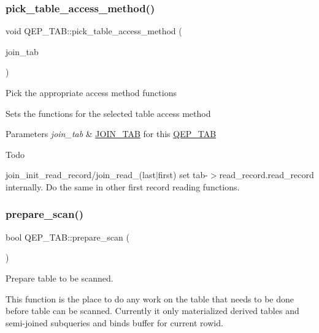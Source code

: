 \subsubsection{\texorpdfstring{pick\+\_\+table\+\_\+access\+\_\+method()}{pick\_table\_access\_method()}}
{\footnotesize\ttfamily void Q\+E\+P\+\_\+\+T\+A\+B\+::pick\+\_\+table\+\_\+access\+\_\+method (\begin{DoxyParamCaption}\item[{const \mbox{\hyperlink{classJOIN__TAB}{J\+O\+I\+N\+\_\+\+T\+AB}} $\ast$}]{join\+\_\+tab }\end{DoxyParamCaption})}

Pick the appropriate access method functions

Sets the functions for the selected table access method


\begin{DoxyParams}{Parameters}
{\em join\+\_\+tab} & \mbox{\hyperlink{classJOIN__TAB}{J\+O\+I\+N\+\_\+\+T\+AB}} for this \mbox{\hyperlink{classQEP__TAB}{Q\+E\+P\+\_\+\+T\+AB}}\\
\hline
\end{DoxyParams}
\begin{DoxyRefDesc}{Todo}
\item[\mbox{\hyperlink{todo__todo000081}{Todo}}]join\+\_\+init\+\_\+read\+\_\+record/join\+\_\+read\+\_\+(last$\vert$first) set tab-\/$>$read\+\_\+record.\+read\+\_\+record internally. Do the same in other first record reading functions. \end{DoxyRefDesc}
\mbox{\label{group__Query__Executor_ga0f7e9ff5a681a6bcc59e6e1f9af62b76}} 
\subsubsection{\texorpdfstring{prepare\+\_\+scan()}{prepare\_scan()}}
{\footnotesize\ttfamily bool Q\+E\+P\+\_\+\+T\+A\+B\+::prepare\+\_\+scan (\begin{DoxyParamCaption}{ }\end{DoxyParamCaption})}



Prepare table to be scanned. 

This function is the place to do any work on the table that needs to be done before table can be scanned. Currently it only materialized derived tables and semi-\/joined subqueries and binds buffer for current rowid.

